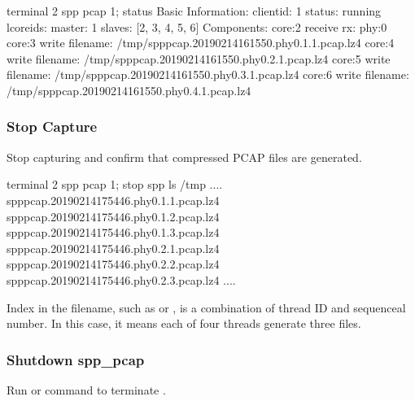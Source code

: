 \documentclass[a4paper,11pt,openany,oneside,english]{sphinxmanual}
\begin{document}
\begin{sphinxVerbatim}[commandchars=\\\{\},formatcom=\footnotesize]
\PYGZsh{} terminal 2
spp \PYGZgt{} pcap 1; status
Basic Information:
  \PYGZhy{} client\PYGZhy{}id: 1
  \PYGZhy{} status: running
  \PYGZhy{} lcore\PYGZus{}ids:
    \PYGZhy{} master: 1
    \PYGZhy{} slaves: [2, 3, 4, 5, 6]
Components:
  \PYGZhy{} core:2 receive
    \PYGZhy{} rx: phy:0
  \PYGZhy{} core:3 write
    \PYGZhy{} filename: /tmp/spp\PYGZus{}pcap.20190214161550.phy0.1.1.pcap.lz4
  \PYGZhy{} core:4 write
    \PYGZhy{} filename: /tmp/spp\PYGZus{}pcap.20190214161550.phy0.2.1.pcap.lz4
  \PYGZhy{} core:5 write
    \PYGZhy{} filename: /tmp/spp\PYGZus{}pcap.20190214161550.phy0.3.1.pcap.lz4
  \PYGZhy{} core:6 write
    \PYGZhy{} filename: /tmp/spp\PYGZus{}pcap.20190214161550.phy0.4.1.pcap.lz4
\end{sphinxVerbatim}


\subsubsection{Stop Capture}
\label{\detokenize{usecases/spp_pcap:stop-capture}}\label{\detokenize{usecases/spp_pcap:spp-pcap-use-case-stop-capture}}
Stop capturing and confirm that compressed PCAP files are generated.

\begin{sphinxVerbatim}[commandchars=\\\{\},formatcom=\footnotesize]
\PYGZsh{} terminal 2
spp \PYGZgt{} pcap 1; stop
spp \PYGZgt{} ls /tmp
....
spp\PYGZus{}pcap.20190214175446.phy0.1.1.pcap.lz4
spp\PYGZus{}pcap.20190214175446.phy0.1.2.pcap.lz4
spp\PYGZus{}pcap.20190214175446.phy0.1.3.pcap.lz4
spp\PYGZus{}pcap.20190214175446.phy0.2.1.pcap.lz4
spp\PYGZus{}pcap.20190214175446.phy0.2.2.pcap.lz4
spp\PYGZus{}pcap.20190214175446.phy0.2.3.pcap.lz4
....
\end{sphinxVerbatim}

Index in the filename, such as  or , is a combination of
 thread ID and sequenceal number.
In this case, it means each of four threads generate three files.


\subsubsection{Shutdown spp\_pcap}
\label{\detokenize{usecases/spp_pcap:shutdown-spp-pcap}}\label{\detokenize{usecases/spp_pcap:spp-pcap-use-case-shutdown}}
Run  or  command to terminate .
\end{document}
